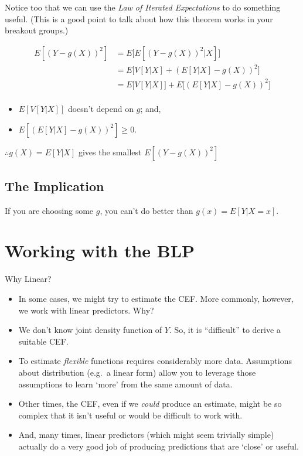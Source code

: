 \documentclass[
]{book}
\providecommand{\tightlist}{%
  \setlength{\itemsep}{0pt}\setlength{\parskip}{0pt}}
\theoremstyle{definition}
\theoremstyle{definition}
\theoremstyle{definition}
\theoremstyle{definition}
\theoremstyle{remark}
\begin{document}
Notice too that we can use the \emph{Law of Iterated Expectations} to do something useful. (This is a good point to talk about how this theorem works in your breakout groups.)

\[
\begin{aligned}
  E[(Y-g(X))^2] &= E\big[E[(Y-g(X))^2|X]\big]     \\ 
    &=E\big[V[Y|X]+(E[Y|X]-g(X))^2\big]           \\
    &=E\big[V[Y|X]\big]+E\big[(E[Y|X]-g(X))^2\big]\\
\end{aligned}
\]

\begin{itemize}
\tightlist
\item
  \(E[V[Y|X]]\) doesn't depend on \(g\); and,
\item
  \(E[(E[Y|X]-g(X))^2] \geq 0\).
\end{itemize}

\(\therefore g(X) = E[Y|X]\) gives the smallest \(E[(Y-g(X))^2]\)

\hypertarget{the-implication}{%
\subsection{The Implication}\label{the-implication}}

If you are choosing some \(g\), you can't do better than \(g(x) = E[Y|X=x]\).

\hypertarget{working-with-the-blp}{%
\section{Working with the BLP}\label{working-with-the-blp}}

Why Linear?

\begin{itemize}
\item
  In some cases, we might try to estimate the CEF. More commonly, however, we work with linear predictors. Why?
\item
  We don't know joint density function of \(Y\). So, it is ``difficult'' to derive a suitable CEF.
\item
  To estimate \emph{flexible} functions requires considerably more data. Assumptions about distribution (e.g.~a linear form) allow you to leverage those assumptions to learn `more' from the same amount of data.
\item
  Other times, the CEF, even if we \emph{could} produce an estimate, might be so complex that it isn't useful or would be difficult to work with.
\item
  And, many times, linear predictors (which might seem trivially simple) actually do a very good job of producing predictions that are `close' or useful.
\end{itemize}
\end{document}
